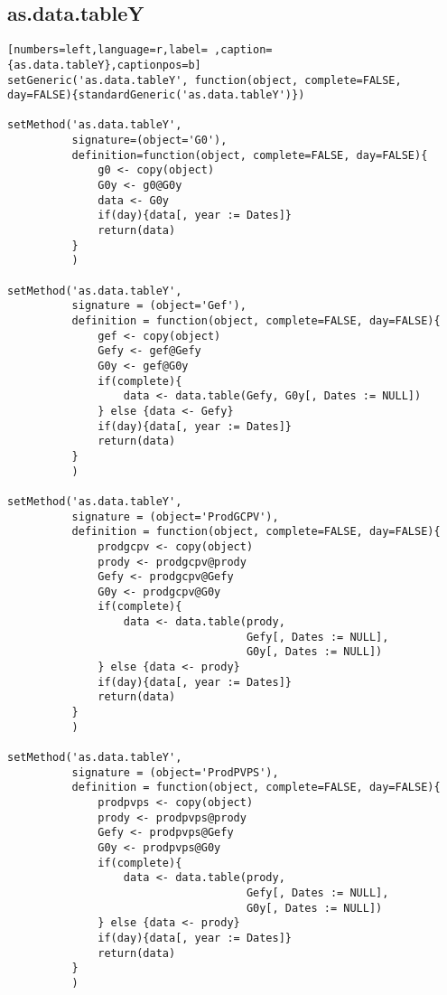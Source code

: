 \subsection{as.data.tableY}
\label{sec:orgd6bfe38}
\label{subsec:as.data.tabley}
\begin{lstlisting}[numbers=left,language=r,label= ,caption={as.data.tableY},captionpos=b]
setGeneric('as.data.tableY', function(object, complete=FALSE, day=FALSE){standardGeneric('as.data.tableY')})

setMethod('as.data.tableY',
          signature=(object='G0'),
          definition=function(object, complete=FALSE, day=FALSE){
              g0 <- copy(object)
              G0y <- g0@G0y
              data <- G0y
              if(day){data[, year := Dates]}
              return(data)
          }
          )

setMethod('as.data.tableY',
          signature = (object='Gef'),
          definition = function(object, complete=FALSE, day=FALSE){
              gef <- copy(object)
              Gefy <- gef@Gefy
              G0y <- gef@G0y
              if(complete){
                  data <- data.table(Gefy, G0y[, Dates := NULL])
              } else {data <- Gefy}
              if(day){data[, year := Dates]}
              return(data)
          }
          )

setMethod('as.data.tableY',
          signature = (object='ProdGCPV'),
          definition = function(object, complete=FALSE, day=FALSE){
              prodgcpv <- copy(object)
              prody <- prodgcpv@prody
              Gefy <- prodgcpv@Gefy
              G0y <- prodgcpv@G0y
              if(complete){
                  data <- data.table(prody,
                                     Gefy[, Dates := NULL],
                                     G0y[, Dates := NULL])       
              } else {data <- prody}
              if(day){data[, year := Dates]}
              return(data)
          }
          )

setMethod('as.data.tableY',
          signature = (object='ProdPVPS'),
          definition = function(object, complete=FALSE, day=FALSE){
              prodpvps <- copy(object)
              prody <- prodpvps@prody
              Gefy <- prodpvps@Gefy
              G0y <- prodpvps@G0y
              if(complete){
                  data <- data.table(prody,
                                     Gefy[, Dates := NULL],
                                     G0y[, Dates := NULL])       
              } else {data <- prody}
              if(day){data[, year := Dates]}
              return(data)
          }
          )
\end{lstlisting}
